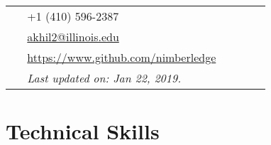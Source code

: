 \documentclass[10pt]{article} %
\begin{document}
\begin{paracol}{2}
\parbox[top][0.12\textheight][c]{\linewidth}{ %
	\vspace{-0.04\textheight} %
	\colorbox{shade}{ %
		\begin{supertabular}{p{0.05\linewidth}|p{0.775\linewidth}} %
			\raisebox{-1pt}{\faPhone} & +1 (410) 596-2387 \\ %
			\raisebox{0pt}{\small\faEnvelope} & \href{mailto:akhil2@illinois.edu}{akhil2@illinois.edu} \\ %
			\raisebox{-1pt}{\faGithub} & \href{https://www.github.com/nimberledge}{https://www.github.com/nimberledge} \\ %
			\raisebox{-1pt}{} & \textit{Last updated on: Jan 22, 2019.}\\
		\end{supertabular}
	}
}



\section{Technical Skills} 





\begin{supertabular}{ll} %
	

\end{supertabular}
\end{paracol}
\end{document}
